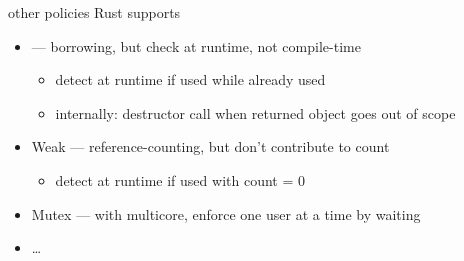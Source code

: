 
\begin{frame}{other policies Rust supports}
    \begin{itemize}
        \item {} --- borrowing, but check at runtime, not compile-time
            \begin{itemize}
            \item detect at runtime if used while already used
            \item internally: destructor call when returned object goes out of scope
            \end{itemize}
        \item Weak --- reference-counting, but don't contribute to count
            \begin{itemize}
            \item detect at runtime if used with count = 0
            \end{itemize}
        \item Mutex --- with multicore, enforce one user at a time by waiting
        \item \ldots
    \end{itemize}
\end{frame}


